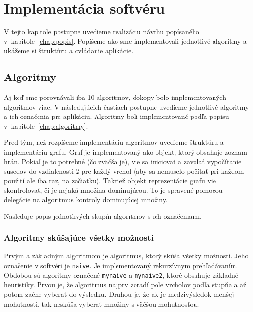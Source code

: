\def\alg#1{\texttt{#1}}

\chapter{Implementácia softvéru}\label{chap:implementacia}

V tejto kapitole postupne uvedieme realizáciu návrhu popísaného 
v~kapitole~\ref{chap:popis}. Popíšeme ako sme implementovali jednotlivé 
algoritmy a ukážeme si štruktúru a ovládanie aplikácie. 


\section{Algoritmy}

Aj keď sme porovnávali iba 10 algoritmov, dokopy bolo implementovaných 
algoritmov viac. V následujúcich častiach postupne uvedieme jednotlivé 
algoritmy a ich označenia pre aplikáciu. Algoritmy boli implementované podľa 
popisu v~kapitole~\ref{chap:algoritmy}.

Pred tým, než rozpíšeme implementáciu algoritmov uvedieme štruktúru a 
implementáciu grafu. Graf je implementovaný ako objekt, ktorý obsahuje 
zoznam hrán. Pokiaľ je to potrebné (čo zväčša je), vie sa iniciovať a zavolať 
vypočítanie susedov do vzdialenosti 2 pre každý vrchol (aby sa nemuselo počítať 
pri každom použití ale iba raz, na začiatku). Taktiež objekt reprezentácie 
grafu vie skontrolovať, či je nejaká množina dominujúcou. To je spravené 
pomocou delegácie na algoritmus kontroly dominujúcej množiny.

Nasleduje popis jednotlivých skupín algoritmov s ich označeniami.

\subsection{Algoritmy skúšajúce všetky možnosti}

Prvým a základným algoritmom je algoritmus, ktorý skúša všetky možnosti. Jeho 
označenie v softvéri je \alg{naive}. Je implementovaný rekurzívnym 
prehľadávaním. Obdobou sú algoritmy označené \alg{mynaive} a \alg{mynaive2}, 
ktoré obsahuje základné heuristiky. Prvou je, že algoritmus najprv zoradí pole 
vrcholov podľa stupňa a až potom začne vyberať do výsledku. Druhou je, že ak 
je medzivýsledok menšej mohutnosti, tak neskúša vyberať množiny s väčšou 
mohutnosťou.

